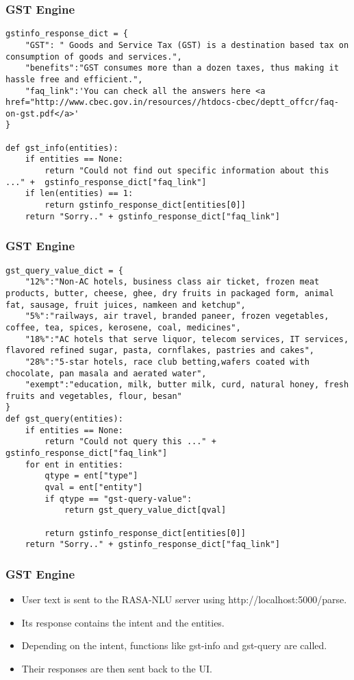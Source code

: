  \begin{frame}[fragile]\frametitle{GST Engine}
\scriptsize
\begin{lstlisting}
gstinfo_response_dict = {
    "GST": " Goods and Service Tax (GST) is a destination based tax on consumption of goods and services.",
    "benefits":"GST consumes more than a dozen taxes, thus making it hassle free and efficient.",
    "faq_link":'You can check all the answers here <a href="http://www.cbec.gov.in/resources//htdocs-cbec/deptt_offcr/faq-on-gst.pdf</a>'
}

def gst_info(entities):
    if entities == None:
        return "Could not find out specific information about this ..." +  gstinfo_response_dict["faq_link"]
    if len(entities) == 1:
        return gstinfo_response_dict[entities[0]]
    return "Sorry.." + gstinfo_response_dict["faq_link"]
\end{lstlisting}
\end{frame}

 \begin{frame}[fragile]\frametitle{GST Engine}
\scriptsize
\begin{lstlisting}
gst_query_value_dict = {
    "12%":"Non-AC hotels, business class air ticket, frozen meat products, butter, cheese, ghee, dry fruits in packaged form, animal fat, sausage, fruit juices, namkeen and ketchup",
    "5%":"railways, air travel, branded paneer, frozen vegetables, coffee, tea, spices, kerosene, coal, medicines",
    "18%":"AC hotels that serve liquor, telecom services, IT services, flavored refined sugar, pasta, cornflakes, pastries and cakes",
    "28%":"5-star hotels, race club betting,wafers coated with chocolate, pan masala and aerated water",
    "exempt":"education, milk, butter milk, curd, natural honey, fresh fruits and vegetables, flour, besan"
}
def gst_query(entities):
    if entities == None:
        return "Could not query this ..." + gstinfo_response_dict["faq_link"]
    for ent in entities:
        qtype = ent["type"]
        qval = ent["entity"]
        if qtype == "gst-query-value":
            return gst_query_value_dict[qval]

        return gstinfo_response_dict[entities[0]]
    return "Sorry.." + gstinfo_response_dict["faq_link"]
\end{lstlisting}
\end{frame}

 \begin{frame}[fragile]\frametitle{GST Engine}
\begin{itemize}
\item User text is sent to the RASA-NLU server using http://localhost:5000/parse. 
\item Its response contains the intent and the entities. 
\item Depending on the intent, functions like gst-info and gst-query are called. 
\item Their responses are then sent back to the UI.
\end{itemize}
\end{frame}

